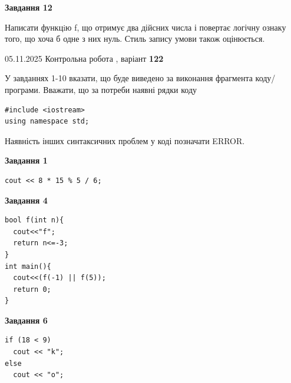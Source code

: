 \documentclass[12pt, ukrainian]{article}
\begin{document}
{\begin {large}
\begin{minipage}[t]{11.0cm}
\begin{center}
\textbf{Завдання 12}
\end{center}

Написати функцiю f, що отримує два дійсних числа і повертає логічну ознаку того, що хоча б одне з них нуль. Стиль запису умови також оцінюється.\par

\end{minipage}

\end {large}}
\newpage

{\Large{05.11.2025 Контрольна робота , варіант  \No \textbf { 122 }\par}}
{
\begin {large}
У завданнях 1-10 вказати, що буде виведено за виконання фрагмента коду/про\-гра\-ми.
Вважати, що за потреби наявні рядки коду
\begin{verbatim}
#include <iostream>
using namespace std;
\end{verbatim}
Наявність інших синтаксичних проблем у коді позначати ERROR.

\begin{minipage}[t]{7.0cm}

\begin{center}
\textbf{Завдання 1}
\end{center}
\vspace{-8mm}

\begin{verbatim}
cout << 8 * 15 % 5 / 6;
\end{verbatim}



\begin{center}
\textbf{Завдання 4}
\end{center}
\vspace{-8mm}

\begin{verbatim}
bool f(int n){
  cout<<"f";
  return n<=-3;
}
int main(){
  cout<<(f(-1) || f(5));
  return 0;
}
\end{verbatim}



\begin{center}
\textbf{Завдання 6}
\end{center}
\vspace{-8mm}

\begin{verbatim}
if (18 < 9)
  cout << "k";
else
  cout << "o";
\end{verbatim}




\end{minipage}
\end{large}}
\end{document}
